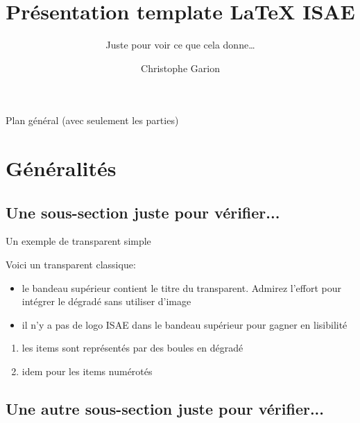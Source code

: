 \documentclass[fr,biblatex,outline]{isae-slides}
\begin{document}
\title[Template \LaTeX{} ISAE]{Présentation template \LaTeX{} ISAE}
\subtitle{Juste pour voir ce que cela donne\ldots}
\author{Christophe Garion}
\subject{Slides to present my beamer class for ISAE slides.}
\date{}

\begin{frame}{}
  \titlepage
\end{frame}

\begin{frame}{Plan général (avec seulement les parties)}
  \tableofcontents[onlyparts]
\end{frame}

\section{Généralités}
\label{sec:gen}

\subsection{Une sous-section juste pour vérifier...}
\label{sec:sub}

\begin{frame}{Un exemple de transparent simple}

\vfill

Voici un transparent classique:

\begin{itemize}
\item le bandeau supérieur contient le titre du transparent. Admirez
  l'effort pour intégrer le dégradé sans utiliser d'image \smiley
\item il n'y a pas de logo ISAE dans le bandeau supérieur pour gagner
  en lisibilité
\end{itemize}

\begin{enumerate}
\item les items sont représentés par des boules en dégradé
\item idem pour les items numérotés
\end{enumerate}

\vfill

\end{frame}

\subsection{Une autre sous-section juste pour vérifier...}
\label{sec:subdeux}
\end{document}
